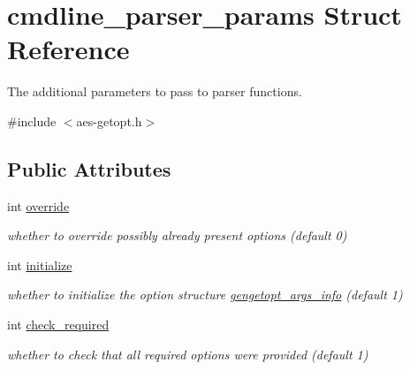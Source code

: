 \hypertarget{structcmdline__parser__params}{}\section{cmdline\+\_\+parser\+\_\+params Struct Reference}
\label{structcmdline__parser__params}


The additional parameters to pass to parser functions.  




{\ttfamily \#include $<$aes-\/getopt.\+h$>$}

\subsection*{Public Attributes}
\begin{DoxyCompactItemize}
\item 
\mbox{\label{structcmdline__parser__params_ad3ff9d69146e69a47506782197b5675c}} 
int \hyperlink{structcmdline__parser__params_ad3ff9d69146e69a47506782197b5675c}{override}
\begin{DoxyCompactList}\small\item\em whether to override possibly already present options (default 0) \end{DoxyCompactList}\item 
\mbox{\label{structcmdline__parser__params_a97ed8a6eabd39291ae7d73f273e12c11}} 
int \hyperlink{structcmdline__parser__params_a97ed8a6eabd39291ae7d73f273e12c11}{initialize}
\begin{DoxyCompactList}\small\item\em whether to initialize the option structure \hyperlink{structgengetopt__args__info}{gengetopt\+\_\+args\+\_\+info} (default 1) \end{DoxyCompactList}\item 
\mbox{\label{structcmdline__parser__params_a44ff439d7e9e36799e59173af74829c6}} 
int \hyperlink{structcmdline__parser__params_a44ff439d7e9e36799e59173af74829c6}{check\+\_\+required}
\begin{DoxyCompactList}\small\item\em whether to check that all required options were provided (default 1) \end{DoxyCompactList}\item 

\end{DoxyCompactItemize}
